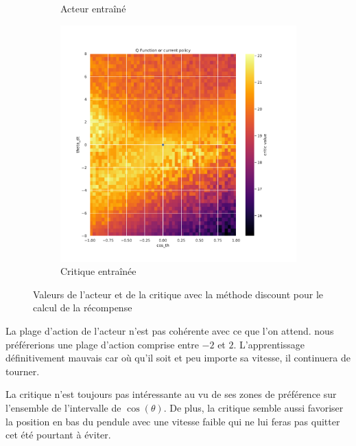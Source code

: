 \begin{figure}[H]
\begin{subfigure}{0.3\textwidth}
        \caption{Acteur entraîné}
    \end{subfigure}
    \begin{subfigure}{0.3\textwidth}
        \includegraphics[width=\textwidth]{figures/iteration3/0_critic_discount_post_Pendulum-v0.pdf}
        \caption{Critique entraînée}
    \end{subfigure}
    \caption{Valeurs de l'acteur et de la critique avec la méthode discount pour le calcul de la récompense}
    \label{fig:itr3_discount}
\end{figure}

La plage d'action de l'acteur n'est pas cohérente avec ce que l'on attend. nous préférerions une plage d'action comprise entre $-2$ et $2$. L'apprentissage définitivement mauvais car où qu'il soit et peu importe sa vitesse, il continuera de tourner.

La critique n'est toujours pas intéressante au vu de ses zones de préférence sur l'ensemble de l'intervalle de $\cos(\theta)$. De plus, la critique semble aussi favoriser la position en bas du pendule avec une vitesse faible qui ne lui feras pas quitter cet été pourtant à éviter.

